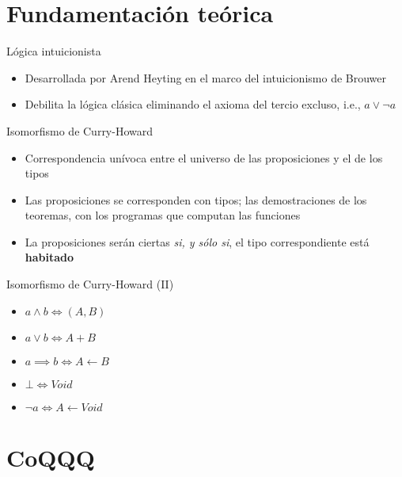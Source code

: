 \documentclass[10pt]{beamer}
\begin{document}
\section{Fundamentación teórica}

\begin{frame}[fragile]{Lógica intuicionista}

  \begin{itemize}
  \item Desarrollada por Arend Heyting en el marco del intuicionismo de Brouwer
  \item Debilita la lógica clásica eliminando el axioma del tercio excluso, i.e., $a \lor \neg a$
  \end{itemize}

\end{frame}

\begin{frame}[fragile]{Isomorfismo de Curry-Howard}

  \begin{itemize}
  \item Correspondencia unívoca entre el universo de las proposiciones y el de los tipos
  \item Las proposiciones se corresponden con tipos; las demostraciones de los teoremas, con los programas que computan las funciones
  \item La proposiciones serán ciertas \textit{si, y sólo si}, el tipo correspondiente está \textbf{habitado}
  \end{itemize}

\end{frame}

\begin{frame}[fragile]{Isomorfismo de Curry-Howard (II)}

  \begin{itemize}
  \item $a \land b \iff (A, B)$
  \item $a \lor b \iff A + B$
  \item $a \implies b \iff A \leftarrow B$
  \item $\bot \iff Void$
  \item $\neg a \iff A \leftarrow Void$
  \end{itemize}

\end{frame}

\section{CoQQQ}
\end{document}
